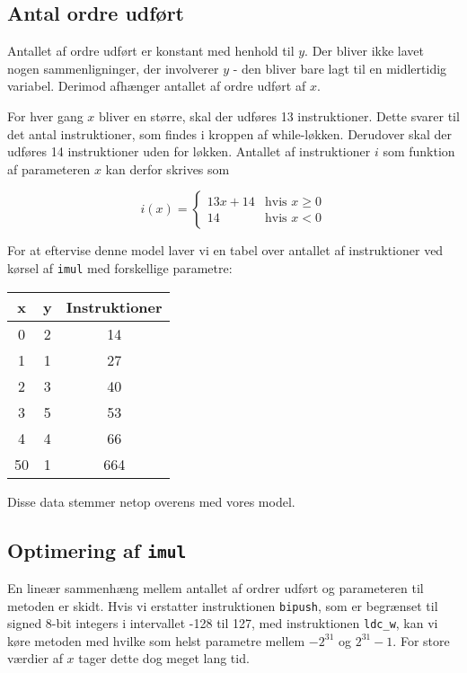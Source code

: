 \documentclass[12pt,a4paper]{article}
\newcommand{\imul}{\texttt{imul}}
\begin{document}
\subsection{Antal ordre udført}
Antallet af ordre udført er konstant med henhold til $y$. Der bliver ikke lavet
nogen sammenligninger, der involverer $y$ - den bliver bare lagt til en
midlertidig variabel. Derimod afhænger antallet af ordre udført af $x$.

For hver gang $x$ bliver en større, skal der udføres 13 instruktioner. Dette
svarer til det antal instruktioner, som findes i kroppen af while-løkken.
Derudover skal der udføres 14 instruktioner uden for løkken.
Antallet af instruktioner $i$ som funktion af parameteren $x$ kan derfor
skrives som

\[i(x)=\left\{\begin{array}{cc}
	13x + 14 & \text{hvis }x\geq0 \\
	14 & \text{hvis }x<0
\end{array}\right.\]


For at eftervise denne model laver vi en tabel over antallet af instruktioner
ved kørsel af \imul{} med forskellige parametre:

\begin{tabular}{|c|c|c|}
\hline
x & y & Instruktioner \\ \hline
0 & 2 & 14  \\ \hline
1 & 1 & 27  \\ \hline
2 & 3 & 40  \\ \hline
3 & 5 & 53  \\ \hline
4 & 4 & 66  \\ \hline
50& 1 & 664 \\ \hline

\end{tabular}

Disse data stemmer netop overens med vores model.

\subsection{Optimering af \imul{}}

En lineær sammenhæng mellem antallet af ordrer udført og parameteren til
metoden er skidt. Hvis vi erstatter instruktionen \texttt{bipush}, som er
begrænset til signed 8-bit integers i intervallet -128 til 127, med
instruktionen \texttt{ldc\_w}, kan vi køre metoden med hvilke som helst
parametre mellem $-2^{31}$ og $2^{31}-1$. For store værdier af $x$ tager dette
dog meget lang tid.
\end{document}
